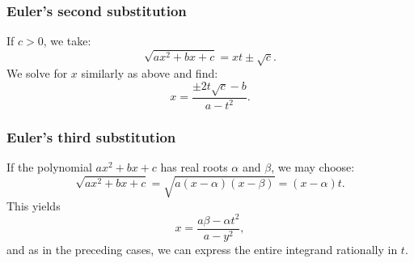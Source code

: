 \subsubsection*{Euler's  second substitution}
\par
If $c>0$, we take:
\[
    \sqrt{ax^2 + bx + c} = xt \pm \sqrt{c}.  
\]
We solve for $x$ similarly as above and find:
\[
    x = \dfrac{\pm 2t \sqrt{c} - b}{a - t^2}.  
\]

\subsubsection*{Euler's third substitution}
\par 
If the polynomial $ax^2 + bx + c$ has real roots $\alpha$ and $\beta$, we may choose:
\[
    \sqrt{ax^2+bx + c} = \sqrt{a(x-\alpha)(x-\beta)} = (x-\alpha)t. 
\]
This yields 
\[
    x = \dfrac{a \beta - \alpha t^2}{a - y^2},  
\]
and as in the preceding cases, we can express the entire integrand rationally in $t$.